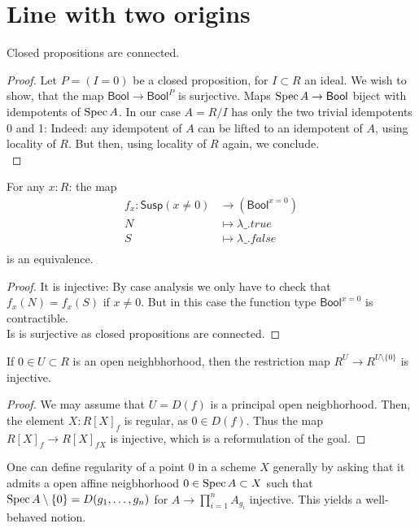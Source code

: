 \documentclass{article}
\newcommand{\Susp}{\mathsf{Susp}}
\newcommand{\Bool}{\mathsf{Bool}}
\begin{document}
\section{Line with two origins}
\begin{lemma}
	Closed propositions are connected.
\end{lemma}
\begin{proof}
	 Let $P = (I = 0)$ be a closed proposition, for $I \subset R$ an ideal. We wish to show, that the map $\Bool \to \Bool^{P}$ is surjective. Maps $\Spec A \to \Bool$ biject with idempotents of $\operatorname{Spec} A$. In our case $A = R/I$ has only the two trivial idempotents 0 and 1: Indeed: any idempotent of $A$ can be lifted to an idempotent of $A$, using locality of $R$. But then, using locality of $R$ again, we conclude. \\
\end{proof}
\begin{lemma}{\label{lemma:X1}}
	For any $x : R$: the map
	\begin{align*}
		f_x : \Susp(x \neq 0) &\to \left(\Bool^{x = 0} \right)\\
		N &\mapsto  \lambda \_ . true \\
		S &\mapsto \lambda \_ . false \\
	\end{align*}
	is an equivalence.
\end{lemma}
\begin{proof}
	It is injective: By case analysis we only have to check that $f_x(N) = f_x(S)$ if $x \neq 0$. But in this case the function type $\Bool^{x=0}$ is contractible. \\
	Is is surjective as closed propositions are connected.
\end{proof}
\begin{lemma}{\label{lemma:AlmostEverywhere}}
	If $0 \in U \subset R$ is an open neighbhorhood, then the restriction map $R^U \to R^{U \setminus \{0\}}$ is injective.
\end{lemma}
\begin{proof}
	We may assume that $U = D(f)$ is a principal open neigbhorhood. Then, the element $X : R[X]_f$ is regular, as $0 \in D(f)$. Thus the map $R[X]_f \to R[X]_{f X}$ is injective, which is a reformulation of the 	goal.
\end{proof}
\begin{rmk}
	One can define regularity of a point 0 in a scheme $X$ generally by asking that it admits a open affine neigbhorhood $0 \in \operatorname{Spec} A \subset X$ such that $\operatorname{Spec} A \setminus \{0\} = D(g_1,\hdots,g_n)$ for $A \to \prod_{i=1}^n A_{g_i}$ injective. This yields a well-behaved notion. \cite{geomstacks}
\end{rmk}
\end{document}
